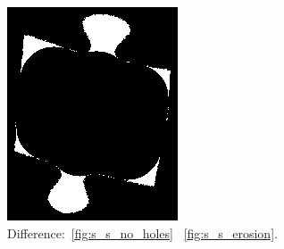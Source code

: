 \documentclass{article}
\begin{document}
\begin{figure}
\begin{subfigure}{0.3\textwidth}
    \includegraphics[width=\linewidth]{pictures/remove_knobs_knob_pixels.png}
    \caption{Difference:~\ref{fig:s_s_no_holes} \textminus~\ref{fig:s_s_erosion}.}
    \label{fig:s_s_no_holes_minus_expansion}
  \end{subfigure}
  \hfill
  \begin{subfigure}{0.3\textwidth}
    \centering

\end{subfigure}
\end{figure}
\end{document}
